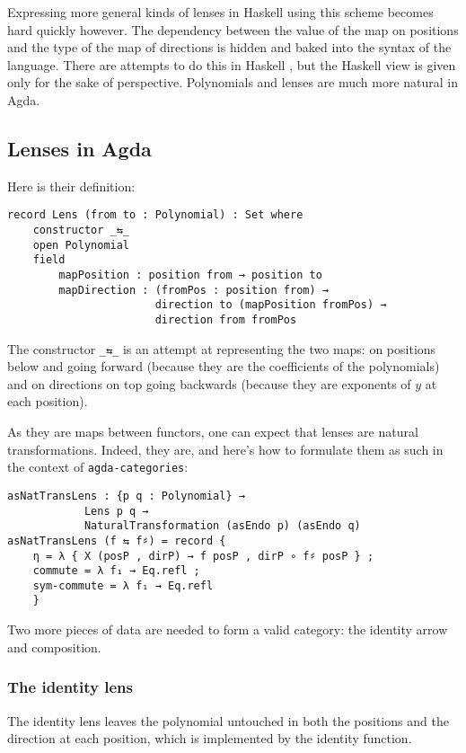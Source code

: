 Expressing more general kinds of lenses in Haskell using this scheme becomes hard quickly however.
The dependency between the value of the map on positions and the type of the map of directions is hidden and baked into the syntax of the language. 
There are attempts to do this in Haskell \cite{iceland_jack_thread} \cite{sjoerd_gist}, but the Haskell view is given only for the sake of perspective. Polynomials and lenses are much more natural in Agda.

\subsection*{Lenses in Agda}
Here is their definition:

\begin{verbatim}
record Lens (from to : Polynomial) : Set where
    constructor _⇆_
    open Polynomial
    field
        mapPosition : position from → position to
        mapDirection : (fromPos : position from) → 
                       direction to (mapPosition fromPos) → 
                       direction from fromPos
\end{verbatim}

The constructor \texttt{_⇆_} is an attempt at representing the two maps: on positions below and going forward (because they are the coefficients of the polynomials) and on directions on top going backwards (because they are exponents of $y$ at each position).

As they are maps between functors, one can expect that lenses are natural transformations. Indeed, they are, and here's how to formulate them as such in the context of \texttt{agda-categories}:

\begin{verbatim}
asNatTransLens : {p q : Polynomial} → 
            Lens p q → 
            NaturalTransformation (asEndo p) (asEndo q)
asNatTransLens (f ⇆ f♯) = record { 
    η = λ { X (posP , dirP) → f posP , dirP ∘ f♯ posP } ; 
    commute = λ f₁ → Eq.refl ; 
    sym-commute = λ f₁ → Eq.refl 
    }
\end{verbatim}

Two more pieces of data are needed to form a valid category: the identity arrow and composition. 

\subsubsection{The identity lens}
The identity lens leaves the polynomial untouched in both the positions and the direction at each position, which is implemented by the identity function.

